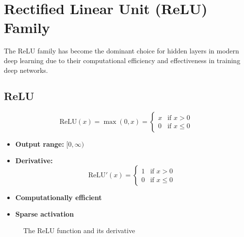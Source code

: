 \section{Rectified Linear Unit (ReLU) Family}

The ReLU family has become the dominant choice for hidden layers in modern deep learning due to their computational efficiency and effectiveness in training deep networks.

\subsection{ReLU}

\begin{equation}
\text{ReLU}(x) = \max(0, x) = 
\begin{cases}
x & \text{if } x > 0 \\
0 & \text{if } x \leq 0
\end{cases}
\end{equation}

\begin{properties}
\begin{itemize}
    \item \textbf{Output range:} $[0, \infty)$
    \item \textbf{Derivative:} 
    \begin{equation}
    \text{ReLU}'(x) = 
    \begin{cases}
    1 & \text{if } x > 0 \\
    0 & \text{if } x \leq 0
    \end{cases}
    \end{equation}
    \item \textbf{Computationally efficient}
    \item \textbf{Sparse activation}
\end{itemize}
\end{properties}

\begin{figure}[htbp]
    \centering
    \caption[ReLU function and its derivative]{The ReLU function and its derivative}
    \label{fig:relu}
\end{figure}

